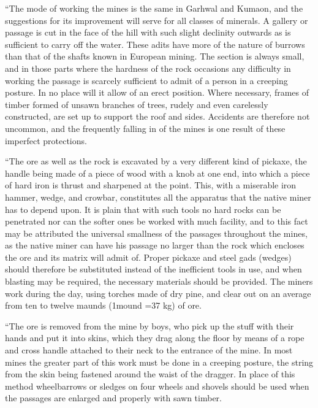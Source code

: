 ``The mode of working the mines is the same in Garhwal and Kumaon, and the suggestions for its improvement will serve for all classes of minerals. A gallery or passage is cut in the face of the hill with such slight declinity outwards as is sufficient to carry off the water. These adits have more of the nature of burrows than that of the shafts known in European mining. The section is always small, and in those parts where the hardness of the rock occasions any difficulty in working the passage is scarcely sufficient to admit of a person in a creeping posture. In no place will it allow of an erect position. Where necessary, frames of timber formed of unsawn branches of trees, rudely and even carelessly constructed, are set up to support the roof and sides. Accidents are therefore not uncommon, and the frequently falling in of the mines is one result of these imperfect protections.

``The ore as well as the rock is excavated by a very different kind of pickaxe, the handle being made of a piece of wood with a knob at one end, into which a piece of hard iron is thrust and sharpened at the point. This, with a miserable iron hammer, wedge, and crowbar, constitutes all the apparatus that the native miner has to depend upon. It is plain that with such tools no hard rocks can be penetrated nor can the softer ones be worked with much facility, and to this fact may be attributed the universal smallness of the passages throughout the mines, as the native miner can have his passage no larger than the rock which encloses the ore and its matrix will admit of. Proper pickaxe and steel gads (wedges) should therefore be substituted instead of the inefficient tools in use, and when blasting may be required, the necessary materials should be provided. The miners work during the day, using torches made of dry pine, and clear out on an average from ten to twelve maunds (1mound =37 kg) of ore.

``The ore is removed from the mine by boys, who pick up the stuff with their hands and put it into skins, which they drag along the floor by means of a rope and cross handle attached to their neck to the entrance of the mine. In most mines the greater part of this work must be done in a creeping posture, the string from the skin being fastened around the waist of the dragger. In place of this method wheelbarrows or sledges on four wheels and shovels should be used when the passages are enlarged and properly with sawn timber.

